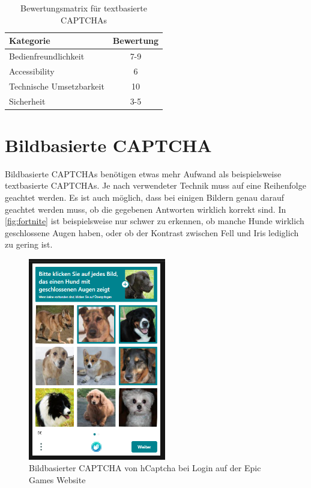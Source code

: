 \begin{table}[h!]
    \caption{Bewertungsmatrix für textbasierte CAPTCHAs}
    \begin{center}
        \begin{tabular}{l|c}
            Kategorie                       & Bewertung \\\hline
            Bedienfreundlichkeit            & 7-9         \\
            Accessibility                   & 6        \\
            Technische Umsetzbarkeit        & 10         \\
            Sicherheit                      & 3-5         
        \end{tabular}
    \end{center}
    \label{table:matrix:text}
\end{table}

\section{Bildbasierte CAPTCHA}
\label{ch:bewertung:bild}
Bildbasierte CAPTCHAs benötigen etwas mehr Aufwand als beispielsweise textbasierte CAPTCHAs.
Je nach verwendeter Technik muss auf eine Reihenfolge geachtet werden. 
Es ist auch möglich, dass bei einigen Bildern genau darauf geachtet werden muss, ob die gegebenen Antworten wirklich korrekt sind.
In \autoref{fig:fortnite} ist beispielsweise nur schwer zu erkennen, ob manche Hunde wirklich geschlossene Augen haben, 
oder ob der Kontrast zwischen Fell und Iris lediglich zu gering ist.

\begin{figure}[h!]
    \centering\includegraphics[width=6cm]{gfx/mygraphics/fuerfortnite.png}
 \caption{Bildbasierter CAPTCHA von hCaptcha bei Login auf der Epic Games Website}
      \label{fig:fortnite}
\end{figure}

